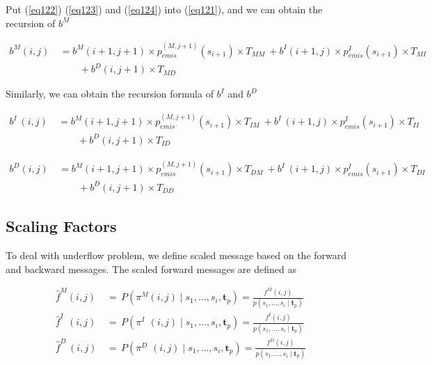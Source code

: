 \documentclass[10pt]{article}
\begin{document}
    Put (\ref{eq122}) (\ref{eq123}) and (\ref{eq124}) into (\ref{eq121}), and we can obtain the recursion of $b^{M}$

    \begin{equation} \label{eq125}
    \begin{aligned}
      b^M(i, j) \
        &= b^M(i+1, j+1) \times p_{emis}^{(M, j+1)}(s_{i+1}) \times T_{MM} \
          + b^{I}(i+1, j) \times p_{emis}^{I}(s_{i+1}) \times T_{MI} \\
          &\qquad+ b^{D}(i, j+1) \times T_{MD}
    \end{aligned}
    \end{equation}

    Similarly, we can obtain the recursion formula of $b^{I}$ and $b^{D\;}$

    \begin{equation} \label{eq126}
    \begin{aligned}
      b^{I\;}(i, j) \
        &= b^M(i+1, j+1) \times p_{emis}^{(M, j+1)}(s_{i+1}) \times T_{IM} \
          + b^{I\;}(i+1, j) \times p_{emis}^{I}(s_{i+1}) \times T_{II} \\
          &\qquad+ b^{D}(i, j+1) \times T_{ID}
    \end{aligned}
    \end{equation}

    \begin{equation}  \label{eq12}
    \begin{aligned}
      b^{D}(i, j) \
        &= b^M(i+1, j+1) \times p_{emis}^{(M, j+1)}(s_{i+1}) \times T_{DM} \
          + b^{I\;}(i+1, j) \times p_{emis}^{I}(s_{i+1}) \times T_{DI} \\
          &\qquad+ b^{D}(i, j+1) \times T_{DD}
    \end{aligned}
    \end{equation}

  \subsection{Scaling Factors}

    To deal with underflow problem, we define scaled message based on the forward and backward messages. The scaled forward messages are defined as

    \begin{equation}
    \begin{aligned}
      \widehat{f}^{M}(i, j) \,&=\, P(\pi^M(i, j) \;|\; s_1, \dots,s_{i}, \mathbf{t}_{p}) = \frac{f^{M}(i, j)}{p(s_1, \dots,s_{i} \;|\; \mathbf{t}_{p})} \\
      \widehat{f}^{I\;\;}(i, j) \,&=\, P(\pi^{I\;\;}(i, j) \;|\; s_1, \dots,s_{i}, \mathbf{t}_{p}) = \frac{f^{I}(i, j)}{p(s_1, \dots,s_{i} \;|\; \mathbf{t}_{p})}\\
      \widehat{f}^{D\;}(i, j) \,&=\, P(\pi^{D\;}\,(i, j) \;|\; s_1, \dots,s_{i}, \mathbf{t}_{p}) = \frac{f^{D}(i, j)}{p(s_1, \dots,s_{i} \;|\; \mathbf{t}_{p})}
    \end{aligned}
    \end{equation}
\end{document}
